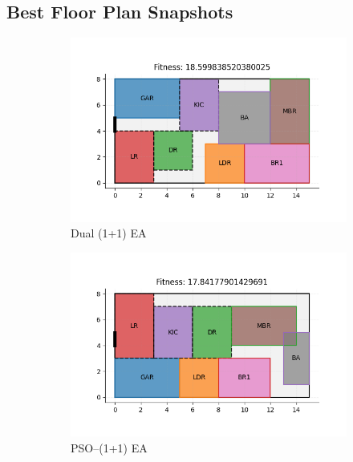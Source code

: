 \documentclass[]{article}
\begin{document}
\subsection{Best Floor Plan Snapshots}
\begin{figure}[ht]
    \centering
    \begin{subfigure}[b]{0.8\textwidth}
        \includegraphics[width=\textwidth]{images/1best_dual_1plus1ea.png}
        \caption{Dual (1+1) EA}
    \end{subfigure}
    \hfill
    \begin{subfigure}[b]{0.8\textwidth}
        \includegraphics[width=\textwidth]{images/1best_pso_1plus1ea.png}
        \caption{PSO--(1+1) EA}
    \end{subfigure}
    \hfill
    \begin{subfigure}[b]{0.8\textwidth}

\end{subfigure}
\end{figure}
\end{document}
